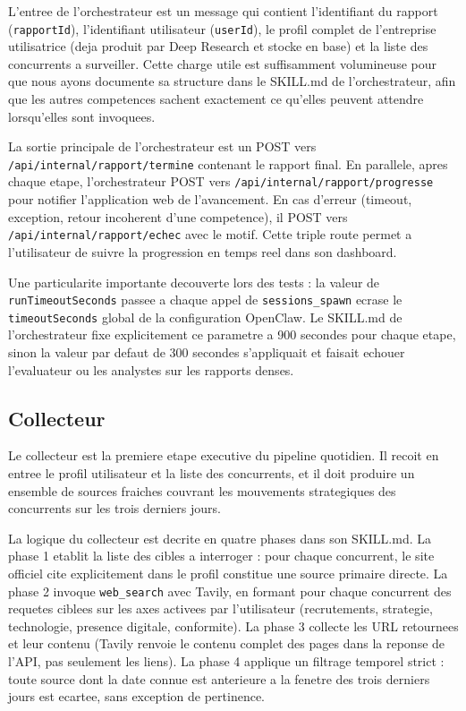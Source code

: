 \documentclass[12pt,a4paper,openany]{report}
\begin{document}
L'entree de l'orchestrateur est un message qui contient l'identifiant du rapport (\texttt{rapportId}), l'identifiant utilisateur (\texttt{userId}), le profil complet de l'entreprise utilisatrice (deja produit par Deep Research et stocke en base) et la liste des concurrents a surveiller. Cette charge utile est suffisamment volumineuse pour que nous ayons documente sa structure dans le SKILL.md de l'orchestrateur, afin que les autres competences sachent exactement ce qu'elles peuvent attendre lorsqu'elles sont invoquees.

La sortie principale de l'orchestrateur est un POST vers \texttt{/api/internal/rapport/termine} contenant le rapport final. En parallele, apres chaque etape, l'orchestrateur POST vers \texttt{/api/internal/rapport/progresse} pour notifier l'application web de l'avancement. En cas d'erreur (timeout, exception, retour incoherent d'une competence), il POST vers \texttt{/api/internal/rapport/echec} avec le motif. Cette triple route permet a l'utilisateur de suivre la progression en temps reel dans son dashboard.

Une particularite importante decouverte lors des tests : la valeur de \texttt{runTimeoutSeconds} passee a chaque appel de \texttt{sessions\_spawn} ecrase le \texttt{timeoutSeconds} global de la configuration OpenClaw. Le SKILL.md de l'orchestrateur fixe explicitement ce parametre a 900 secondes pour chaque etape, sinon la valeur par defaut de 300 secondes s'appliquait et faisait echouer l'evaluateur ou les analystes sur les rapports denses.

\subsection{Collecteur}
\label{sec:skill-collecteur}

Le collecteur est la premiere etape executive du pipeline quotidien. Il recoit en entree le profil utilisateur et la liste des concurrents, et il doit produire un ensemble de sources fraiches couvrant les mouvements strategiques des concurrents sur les trois derniers jours.

La logique du collecteur est decrite en quatre phases dans son SKILL.md. La phase 1 etablit la liste des cibles a interroger : pour chaque concurrent, le site officiel cite explicitement dans le profil constitue une source primaire directe. La phase 2 invoque \texttt{web\_search} avec Tavily, en formant pour chaque concurrent des requetes ciblees sur les axes activees par l'utilisateur (recrutements, strategie, technologie, presence digitale, conformite). La phase 3 collecte les URL retournees et leur contenu (Tavily renvoie le contenu complet des pages dans la reponse de l'API, pas seulement les liens). La phase 4 applique un filtrage temporel strict : toute source dont la date connue est anterieure a la fenetre des trois derniers jours est ecartee, sans exception de pertinence.
\end{document}
